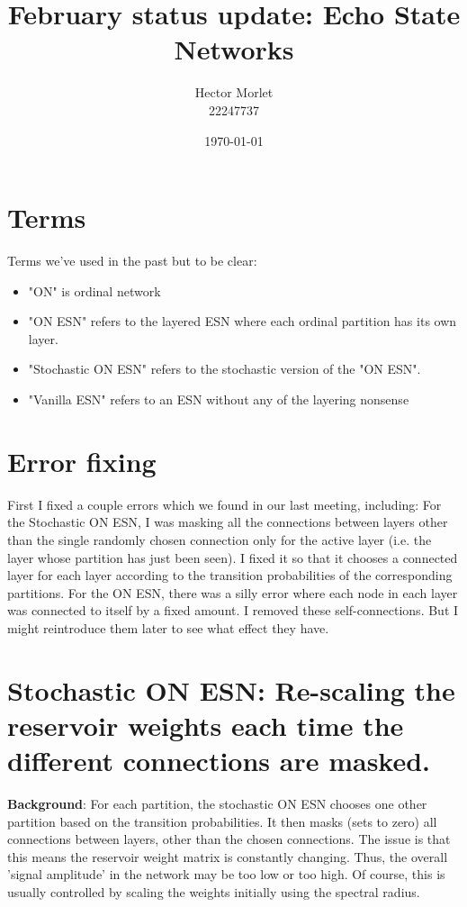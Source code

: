 \documentclass[a4paper,12pt]{article}
\title{February status update: Echo State Networks}
\author{Hector Morlet \\ 22247737}
\date{\today}
\begin{document}
\maketitle

\section{Terms}

Terms we've used in the past but to be clear:
\begin{itemize}
\item "ON" is ordinal network
\item "ON ESN" refers to the layered ESN where each ordinal partition has its own layer.
\item "Stochastic ON ESN" refers to the stochastic version of the "ON ESN".
\item "Vanilla ESN" refers to an ESN without any of the layering nonsense
\end{itemize}


\section{Error fixing}

First I fixed a couple errors which we found in our last meeting, including:
For the Stochastic ON ESN, I was masking all the connections between layers other than the single randomly chosen connection only for the active layer (i.e. the layer whose partition has just been seen). I fixed it so that it chooses a connected layer for each layer according to the transition probabilities of the corresponding partitions.
For the ON ESN, there was a silly error where each node in each layer was connected to itself by a fixed amount. I removed these self-connections. But I might reintroduce them later to see what effect they have.


\section{Stochastic ON ESN: Re-scaling the reservoir weights each time the different connections are masked.}

\textbf{Background}: For each partition, the stochastic ON ESN chooses one other partition based on the transition probabilities. It then masks (sets to zero) all connections between layers, other than the chosen connections. The issue is that this means the reservoir weight matrix is constantly changing. Thus, the overall 'signal amplitude' in the network may be too low or too high. Of course, this is usually controlled by scaling the weights initially using the spectral radius.
\end{document}
